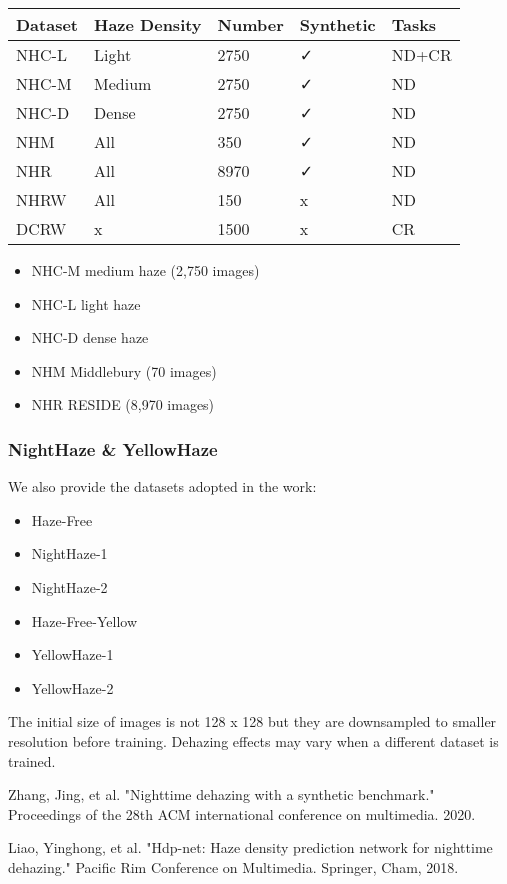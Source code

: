 \documentclass[UTF8]{ctexart}
\begin{document}
\begin{table}[]
    \centering
    \begin{tabular}{lllll}
    \hline
    Dataset & Haze Density & Number & Synthetic & Tasks \\ \hline
    NHC-L   & Light        & 2750   & ✓         & ND+CR \\
    NHC-M   & Medium       & 2750   & ✓         & ND    \\
    NHC-D   & Dense        & 2750   & ✓         & ND    \\
    NHM     & All          & 350    & ✓         & ND    \\
    NHR     & All          & 8970   & ✓         & ND    \\
    NHRW    & All          & 150    & x         & ND    \\
    DCRW    & x            & 1500   & x         & CR    \\ \hline
    \end{tabular}
    \end{table}

\begin{itemize}
    \item NHC-M medium haze (2,750 images)
    \item NHC-L light haze
    \item NHC-D dense haze
    \item NHM Middlebury (70 images)
    \item NHR RESIDE (8,970 images)
\end{itemize}

\subsubsection{NightHaze \& YellowHaze~\cite{hdp}}
We also provide the datasets adopted in the work:
\begin{itemize}
    \item Haze-Free
    \item NightHaze-1
    \item NightHaze-2
    \item Haze-Free-Yellow
    \item YellowHaze-1
    \item YellowHaze-2
\end{itemize}

The initial size of images is not 128 x 128 but they are
downsampled to smaller resolution before training.
Dehazing effects may vary when a different dataset is trained.



\begin{thebibliography}{8}
    Zhang, Jing, et al. "Nighttime dehazing with a synthetic benchmark." Proceedings of the 28th ACM international conference on multimedia. 2020.

    Liao, Yinghong, et al. "Hdp-net: Haze density prediction network for nighttime dehazing." Pacific Rim Conference on Multimedia. Springer, Cham, 2018.

\end{thebibliography}
\end{document}
